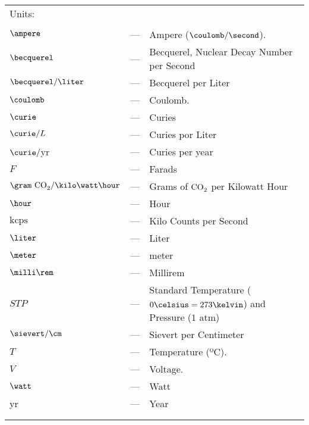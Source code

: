\begin{longtable}{p{25mm} c p{120mm} }
\multicolumn{3}{l}{Units:}\\
\\
$\ampere$ & --- & Ampere ($\coulomb/\second$).\\
$\becquerel$ & --- & Becquerel, Nuclear Decay Number per Second\\
$\becquerel/\liter$ & --- & Becquerel per Liter\\
$\coulomb$ & --- & Coulomb.\\
$\curie$ & --- & Curies\\
$\curie/L$ & --- & Curies por Liter\\
$\curie/$yr & --- & Curies per year\\
$F$ & --- & Farads\\
$\gram~\ce{CO_2} /\kilo\watt\hour$ & --- & Grams of $\ce{CO_2}$ per Kilowatt Hour\\
$\hour$ & --- & Hour\\
$\text{kcps}$ & --- & Kilo Counts per Second\\
$\liter$ & --- & Liter\\
$\meter$ & --- & meter\\
$\milli\rem$ & --- & Millirem\\
$STP$ & --- & Standard Temperature ($0\celsius=273\kelvin$) and Pressure ($1$ atm)\\
$\sievert/\cm$ & --- & Sievert per Centimeter\\
$T$ & --- & Temperature (ºC).\\
$V$ & --- & Voltage.\\
$\watt$ & --- & Watt\\
yr & --- & Year\\
\\
\\
\end{longtable}
